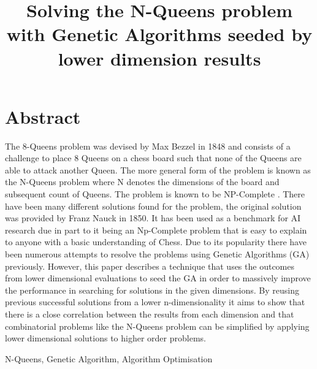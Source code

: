 \documentclass[conference]{IEEEtran}
\begin{document}
\title{\vspace{-1cm}Solving the N-Queens problem with Genetic Algorithms seeded by lower dimension results}
\author{
}

\maketitle


\section{Abstract}
The 8-Queens problem was devised by Max Bezzel in 1848 and consists of a challenge to place 8 Queens on a chess board such that none of the Queens are able to attack another Queen. The more general form of the problem is known as the N-Queens problem where N denotes the dimensions of the board and subsequent count of Queens. The problem is known to be NP-Complete \cite{Complexity}. There have been many different solutions found for the problem, the original solution was provided by Franz Nauck in 1850. It has been used as a benchmark for AI research due in part to it being an Np-Complete problem that is easy to explain to anyone with a basic understanding of Chess. Due to its popularity there have been numerous attempts to resolve the problems using Genetic Algorithms (GA) previously. However, this paper describes a technique that uses the outcomes from lower dimensional evaluations to seed the GA in order to massively improve the performance in searching for solutions in the given dimensions. By reusing previous successful solutions from a lower n-dimensionality it aims to show that there is a close correlation between the results from each dimension and that combinatorial problems like the N-Queens problem can be simplified by applying lower dimensional solutions to higher order problems.

\begin{IEEEkeywords}
	N-Queens, Genetic Algorithm, Algorithm Optimisation
\end{IEEEkeywords}
\end{document}

